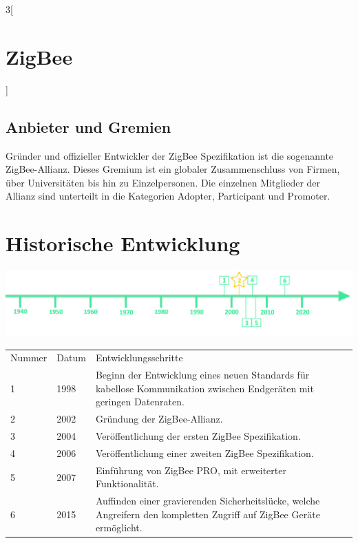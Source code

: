 \begin{multicols}{3}[\section{ZigBee}]
\subsection*{Anbieter und Gremien}
Gründer und offizieller Entwickler der ZigBee Spezifikation ist die sogenannte ZigBee-Allianz. Dieses Gremium ist ein globaler Zusammenschluss von Firmen, über Universitäten bis hin zu Einzelpersonen. Die einzelnen Mitglieder der Allianz sind unterteilt in die Kategorien Adopter, Participant und Promoter.


\end{multicols}
\newpage
\section*{Historische Entwicklung}
\includegraphics[width=\textwidth]{Kapitel/ZigBee/Grafiken/Zeitstrahl}
\par
\noindent
{}
\begin{tabular}{p{1 cm}p{3 cm}p{13.55 cm}}
	Nummer & Datum & Entwicklungsschritte~\cite{zigbee.5}\\
	1 & 1998 & Beginn der Entwicklung eines neuen Standards für kabellose Kommunikation zwischen Endgeräten mit geringen Datenraten.\\
	2 & 2002 & Gründung der ZigBee-Allianz.\\
	3 & 2004 & Veröffentlichung der ersten ZigBee Spezifikation.\\
	4 & 2006 & Veröffentlichung einer zweiten ZigBee Spezifikation.\\
	5 & 2007 & Einführung von ZigBee PRO, mit erweiterter Funktionalität.\\
	6 & 2015 & Auffinden einer gravierenden Sicherheitslücke, welche Angreifern den kompletten Zugriff auf ZigBee Geräte ermöglicht.\\
\end{tabular}
\par
